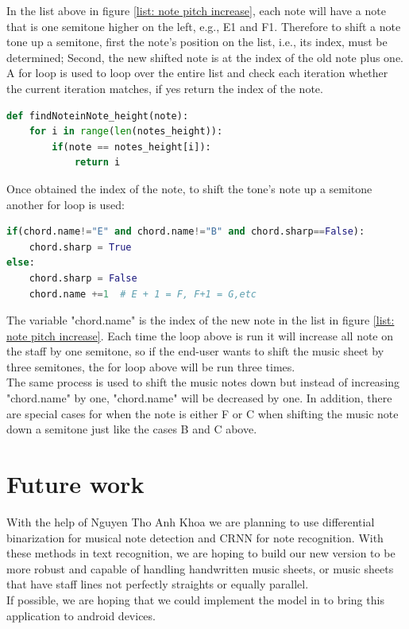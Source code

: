 \documentclass[a4paper,12pt]{report}
\begin{document}
\medskip

In the list above in figure \ref{list: note pitch increase}, each note will have
a note that is one semitone higher on the left, e.g., E1 and F1.  Therefore to
shift a note tone up a semitone, first the note's position on the list, i.e.,
its index, must be determined; Second, the new shifted note is at the index of
the old note plus one.\\

A for loop is used to loop over the entire list and check each
iteration whether the current iteration matches, if yes return the index of the note.\\

\begin{lstlisting}[language=Python]
def findNoteinNote_height(note):
    for i in range(len(notes_height)):
        if(note == notes_height[i]):
            return i
\end{lstlisting}
\medskip

Once obtained the index of the note, to shift the tone's note up a semitone 
another for loop is used:\\

\begin{lstlisting}[language=Python]
if(chord.name!="E" and chord.name!="B" and chord.sharp==False):
    chord.sharp = True
else:
    chord.sharp = False
    chord.name +=1  # E + 1 = F, F+1 = G,etc
\end{lstlisting}
\medskip
The variable "chord.name" is the index of the new note in the list in figure
\ref{list: note pitch increase}.  Each time the loop above is run it will
increase all note on the staff by one semitone, so if the end-user wants to shift
the music sheet by three semitones, the for loop above will be run three
times.\\

The same process is used to shift the music notes down but instead of increasing
"chord.name" by one, "chord.name" will be decreased by one. In addition, there are
special cases for when the note is either F or C when shifting the music note
down a semitone just like the cases B and C above.


\section{Future work}
With the help of Nguyen Tho Anh Khoa we are
planning to use differential binarization for musical note detection and CRNN
for note recognition. With these methods in text recognition, we are hoping to
build our new version to be more robust and capable of handling handwritten music
sheets, or music sheets that have staff lines not perfectly straights or
equally parallel.\\

If possible, we are hoping that we could implement the model in
\textcite{Pacha2017} to bring this application to android devices.

\printbibliography
\end{document}
